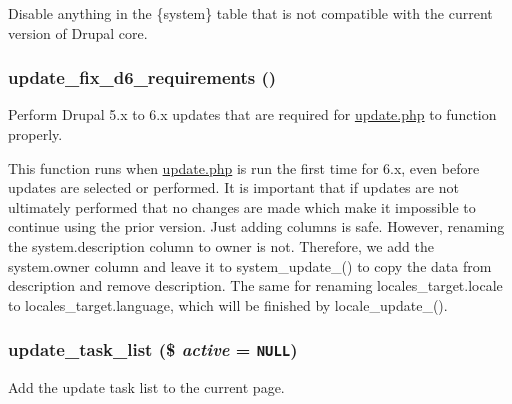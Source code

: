 Disable anything in the \{system\} table that is not compatible with the current version of Drupal core. \hypertarget{update_8php_f9abb57ca11fefe877843be4211307c4}{
\subsubsection[{update\_\-fix\_\-d6\_\-requirements}]{\setlength{\rightskip}{0pt plus 5cm}update\_\-fix\_\-d6\_\-requirements ()}}
\label{update_8php_f9abb57ca11fefe877843be4211307c4}


Perform Drupal 5.x to 6.x updates that are required for \hyperlink{update_8php}{update.php} to function properly.

This function runs when \hyperlink{update_8php}{update.php} is run the first time for 6.x, even before updates are selected or performed. It is important that if updates are not ultimately performed that no changes are made which make it impossible to continue using the prior version. Just adding columns is safe. However, renaming the system.description column to owner is not. Therefore, we add the system.owner column and leave it to system\_\-update\_() to copy the data from description and remove description. The same for renaming locales\_\-target.locale to locales\_\-target.language, which will be finished by locale\_\-update\_(). \hypertarget{update_8php_3563d865f4b5eb7e86e9254410438679}{
\subsubsection[{update\_\-task\_\-list}]{\setlength{\rightskip}{0pt plus 5cm}update\_\-task\_\-list (\$ {\em active} = {\tt NULL})}}
\label{update_8php_3563d865f4b5eb7e86e9254410438679}


Add the update task list to the current page. 